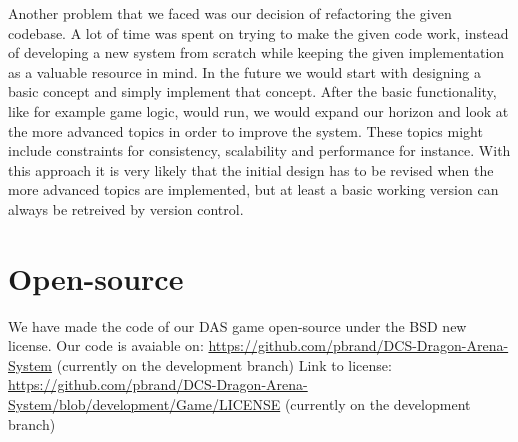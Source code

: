 Another problem that we faced was our decision of refactoring the given codebase. 
A lot of time was spent on trying to make the given code work, instead of developing a new system from scratch while keeping the given implementation as a valuable resource in mind.
In the future we would start with designing a basic concept and simply implement that concept. After the basic functionality, like for example game logic, would run, we would expand our horizon and look at the more advanced topics in order to improve the system. These topics might include constraints for consistency, scalability and performance for instance.
With this approach it is very likely that the initial design has to be revised when the more advanced topics are implemented, but at least a basic working version can always be retreived by version control.

\section{Open-source}
We have made the code of our DAS game open-source under the BSD new license.
Our code is avaiable on: \url{https://github.com/pbrand/DCS-Dragon-Arena-System} (currently on the development branch)
Link to license: \url{https://github.com/pbrand/DCS-Dragon-Arena-System/blob/development/Game/LICENSE} (currently on the development branch)
